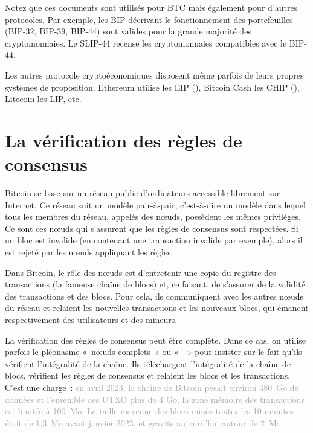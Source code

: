 Notez que ces documents sont utilisés pour BTC mais également pour d'autres protocoles. Par exemple, les BIP décrivant le fonctionnement des portefeuilles (BIP-32, BIP-39, BIP-44) sont valides pour la grande majorité des cryptomonnaies. Le SLIP-44 recense les cryptomonnaies compatibles avec le BIP-44.

Les autres protocole cryptoéconomiques disposent même parfois de leurs propres systèmes de proposition. Ethereum utilise les EIP (), Bitcoin Cash les CHIP (), Litecoin les LIP, etc.

\section*{La vérification des règles de consensus}

Bitcoin se base sur un réseau public d'ordinateurs accessible librement sur Internet. Ce réseau suit un modèle pair-à-pair, c'est-à-dire un modèle dans lequel tous les membres du réseau, appelés des nœuds, possèdent les mêmes privilèges. Ce sont ces nœuds qui s'assurent que les règles de consensus sont respectées. Si un bloc est invalide (en contenant une transaction invalide par exemple), alors il est rejeté par les nœuds appliquant les règles.

Dans Bitcoin, le rôle des nœuds est d'entretenir une copie du registre des transactions (la fameuse chaîne de blocs) et, ce faisant, de s'assurer de la validité des transactions et des blocs. Pour cela, ils communiquent avec les autres nœuds du réseau et relaient les nouvelles transactions et les nouveaux blocs, qui émanent respectivement des utilisateurs et des mineurs.

La vérification des règles de consensus peut être complète. Dans ce cas, on utilise parfois le pléonasme «~nœuds complets~» ou «~~» pour insister sur le fait qu'ils vérifient l'intégralité de la chaîne. Ils téléchargent l'intégralité de la chaîne de blocs, vérifient les règles de consensus et relaient les blocs et les transactions. C'est une charge~: \textcolor{darkgray}{en avril 2023, la chaîne de Bitcoin pesait environ 480~Go de données et l'ensemble des UTXO plus de 4 Go, la zone mémoire des transactions est limitée à 100~Mo. La taille moyenne des blocs minés toutes les 10 minutes était de 1,3~Mo avant janvier 2023, et gravite aujourd'hui autour de 2~Mo.}

